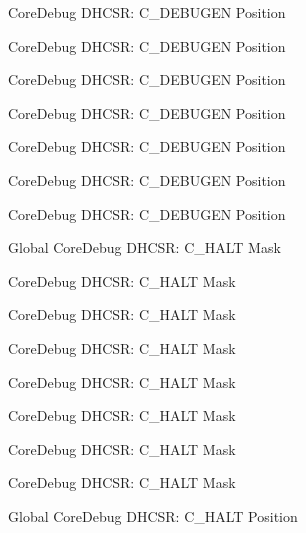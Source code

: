 \begin{DoxyRefList}
\label{deprecated__deprecated000325}%
%
Core\+Debug DHCSR\+: C\+\_\+\+DEBUGEN Position 

\label{deprecated__deprecated000592}%
%
Core\+Debug DHCSR\+: C\+\_\+\+DEBUGEN Position 

\label{deprecated__deprecated000039}%
%
Core\+Debug DHCSR\+: C\+\_\+\+DEBUGEN Position 

\label{deprecated__deprecated000127}%
%
Core\+Debug DHCSR\+: C\+\_\+\+DEBUGEN Position 

\label{deprecated__deprecated000490}%
%
Core\+Debug DHCSR\+: C\+\_\+\+DEBUGEN Position 

\label{deprecated__deprecated000266}%
%
Core\+Debug DHCSR\+: C\+\_\+\+DEBUGEN Position 

\label{deprecated__deprecated000401}%
%
Core\+Debug DHCSR\+: C\+\_\+\+DEBUGEN Position  
\item[Global \doxylink{group___c_m_s_i_s___core_debug_ga1d905a3aa594eb2e8bb78bcc4da05b3f}{Core\+Debug\+\_\+\+DHCSR\+\_\+\+C\+\_\+\+HALT\+\_\+\+Msk} ]\label{deprecated__deprecated000038}%
%
Core\+Debug DHCSR\+: C\+\_\+\+HALT Mask 

\label{deprecated__deprecated000324}%
%
Core\+Debug DHCSR\+: C\+\_\+\+HALT Mask 

\label{deprecated__deprecated000265}%
%
Core\+Debug DHCSR\+: C\+\_\+\+HALT Mask 

\label{deprecated__deprecated000591}%
%
Core\+Debug DHCSR\+: C\+\_\+\+HALT Mask 

\label{deprecated__deprecated000126}%
%
Core\+Debug DHCSR\+: C\+\_\+\+HALT Mask 

\label{deprecated__deprecated000489}%
%
Core\+Debug DHCSR\+: C\+\_\+\+HALT Mask 

\label{deprecated__deprecated000400}%
%
Core\+Debug DHCSR\+: C\+\_\+\+HALT Mask 

\label{deprecated__deprecated000182}%
%
Core\+Debug DHCSR\+: C\+\_\+\+HALT Mask  
\item[Global \doxylink{group___c_m_s_i_s___core_debug_gaddf1d43f8857e4efc3dc4e6b15509692}{Core\+Debug\+\_\+\+DHCSR\+\_\+\+C\+\_\+\+HALT\+\_\+\+Pos} ]\label{deprecated__deprecated000181}%
%
Core\+Debug DHCSR\+: C\+\_\+\+HALT Position 


\end{DoxyRefList}
